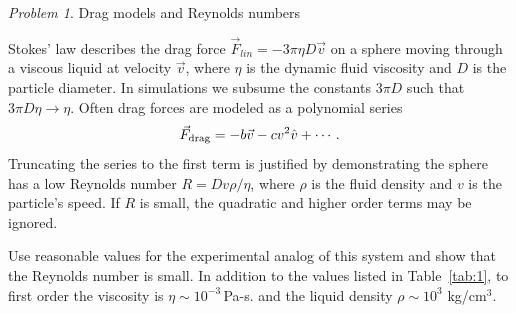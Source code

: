 \documentclass[preprint,showpacs,preprintnumbers,amsmath,amssymb,aps,prb]{revtex4-1}
\theoremstyle{remark}
\newtheorem{problem}{Problem}
\begin{document}
  \begin{problem}{Drag models and Reynolds numbers}
\label{ex:reynolds}

\noindent Stokes' law describes the drag force
  $\vec{F}_{lin} = -3 \pi \eta D \vec{v}$ 
  on a sphere
  moving through a viscous liquid at velocity $\vec{v}$,
  where $\eta$ is the dynamic fluid viscosity and 
  $D$ is the particle diameter.\cite{Taylor2005}
  In simulations we
  subsume the constants $3 \pi D$
  such that $3 \pi D \eta \rightarrow \eta $.
  Often drag forces are
  modeled as a polynomial series\cite{Taylor2005}
  \begin{equation}
    \vec{F}_{\rm drag} = -b \vec{v} - c v^2 \hat{v} + \cdots  .
  \end{equation}
  Truncating the series to the first term
  is justified by demonstrating the sphere
  has a low Reynolds number  
  $R = D v \rho / \eta$,
  where $\rho$ is the fluid density and $v$ is the particle's speed.
  If $R$ is small, the quadratic and higher order terms
  may be ignored.

Use reasonable values for the
  experimental analog of this system and show 
that the Reynolds number is small.
In addition to the values listed in Table~\ref{tab:1},
to first order
the viscosity is $\eta \sim 10^{-3}$\,Pa-s.\cite{Volpe2013}
and 
the liquid density 
$\rho \sim 10^3$ kg/cm$^3$.\cite{asce}
  \end{problem}


  
\end{document}
